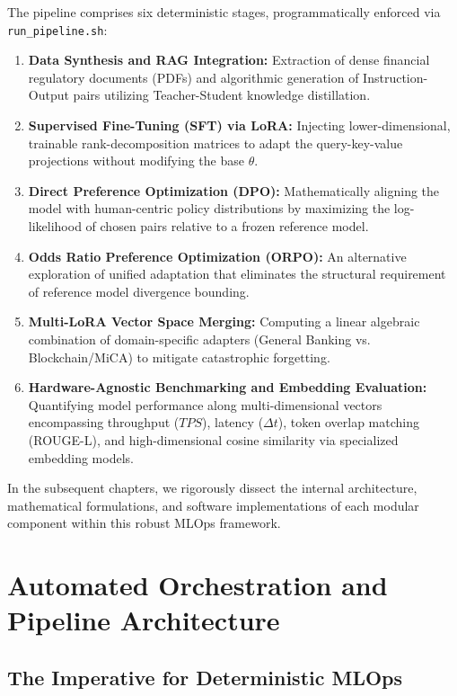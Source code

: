 \documentclass[12pt,a4paper]{report}
\begin{document}
The pipeline comprises six deterministic stages, programmatically enforced via \texttt{run_pipeline.sh}:
\begin{enumerate}
    \item \textbf{Data Synthesis and RAG Integration:} Extraction of dense financial regulatory documents (PDFs) and algorithmic generation of Instruction-Output pairs utilizing Teacher-Student knowledge distillation.
    \item \textbf{Supervised Fine-Tuning (SFT) via LoRA:} Injecting lower-dimensional, trainable rank-decomposition matrices \cite{hu2021lora} to adapt the query-key-value projections without modifying the base $\theta$.
    \item \textbf{Direct Preference Optimization (DPO):} Mathematically aligning the model with human-centric policy distributions \cite{rafailov2023dpo} by maximizing the log-likelihood of chosen pairs relative to a frozen reference model.
    \item \textbf{Odds Ratio Preference Optimization (ORPO):} An alternative exploration of unified adaptation \cite{hong2024orpo} that eliminates the structural requirement of reference model divergence bounding.
    \item \textbf{Multi-LoRA Vector Space Merging:} Computing a linear algebraic combination of domain-specific adapters (General Banking vs. Blockchain/MiCA) \cite{yadav2023ties} to mitigate catastrophic forgetting.
    \item \textbf{Hardware-Agnostic Benchmarking and Embedding Evaluation:} Quantifying model performance along multi-dimensional vectors encompassing throughput ($TPS$), latency ($\Delta t$), token overlap matching (ROUGE-L), and high-dimensional cosine similarity via specialized embedding models.
\end{enumerate}

In the subsequent chapters, we rigorously dissect the internal architecture, mathematical formulations, and software implementations of each modular component within this robust MLOps framework.

\chapter{Automated Orchestration and Pipeline Architecture}
\label{chap:orchestration}

\section{The Imperative for Deterministic MLOps}
\end{document}
